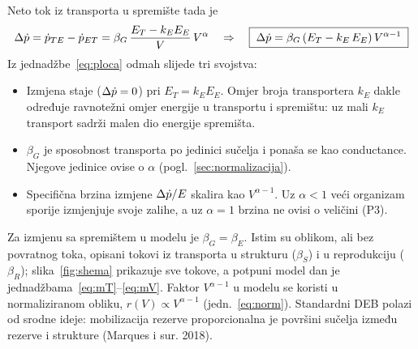 Neto tok iz transporta u spremište tada je
\begin{equation}\label{eq:ploca}
\Delta\dot{p}=\dot{p}_{TE}-\dot{p}_{ET}=\beta_G\,\frac{E_T-k_E E_E}{V}\,V^{\alpha}
\quad\Rightarrow\quad
\boxed{\;\Delta\dot{p}=\beta_G\,(E_T-k_E\,E_E)\,V^{\alpha-1}\;}
\end{equation}
Iz jednadžbe~\eqref{eq:ploca} odmah slijede tri svojstva:
\begin{itemize}
\item Izmjena staje ($\Delta\dot{p}=0$) pri $E_T=k_E E_E$. Omjer broja transportera $k_E$ dakle određuje ravnotežni omjer energije u transportu i spremištu: uz mali $k_E$ transport sadrži malen dio energije spremišta.
\item $\beta_G$ je sposobnost transporta po jedinici sučelja i ponaša se kao conductance. Njegove jedinice ovise o $\alpha$ (pogl.~\ref{sec:normalizacija}).
\item Specifična brzina izmjene $\Delta\dot{p}/E$ skalira kao $V^{\alpha-1}$. Uz $\alpha<1$ veći organizam sporije izmjenjuje svoje zalihe, a uz $\alpha=1$ brzina ne ovisi o veličini (P3).
\end{itemize}
Za izmjenu sa spremištem u modelu je $\beta_G=\beta_E$. Istim su oblikom, ali bez povratnog toka, opisani tokovi iz transporta u strukturu ($\beta_S$) i u reprodukciju ($\beta_R$); slika~\ref{fig:shema} prikazuje sve tokove, a potpuni model dan je jednadžbama~\eqref{eq:mT}–\eqref{eq:mV}. Faktor $V^{\alpha-1}$ u modelu se koristi u normaliziranom obliku, $r(V)\propto V^{\alpha-1}$ (jedn.~\eqref{eq:norm}). Standardni DEB polazi od srodne ideje: mobilizacija rezerve proporcionalna je površini sučelja između rezerve i strukture (Marques i sur. 2018).

